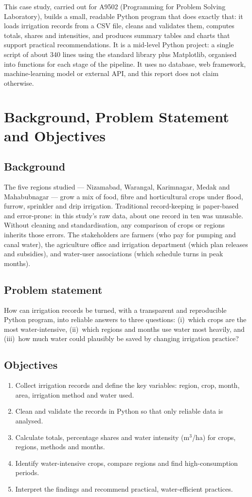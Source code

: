 \documentclass[11pt,a4paper]{article}
\begin{document}
This case study, carried out for A9502 (Programming for Problem Solving Laboratory),
builds a small, readable Python program that does exactly that: it loads irrigation
records from a CSV file, cleans and validates them, computes totals, shares and
intensities, and produces summary tables and charts that support practical
recommendations. It is a mid-level Python project: a single script of about 340 lines
using the standard library plus Matplotlib, organised into functions for each stage of
the pipeline. It uses no database, web framework, machine-learning model or external
API, and this report does not claim otherwise.

\section{Background, Problem Statement and Objectives}
\subsection{Background}
The five regions studied --- Nizamabad, Warangal, Karimnagar, Medak and
Mahabubnagar --- grow a mix of food, fibre and horticultural crops under flood,
furrow, sprinkler and drip irrigation. Traditional record-keeping is paper-based and
error-prone: in this study's raw data, about one record in ten was unusable. Without
cleaning and standardisation, any comparison of crops or regions inherits those errors.
The stakeholders are farmers (who pay for pumping and canal water), the agriculture
office and irrigation department (which plan releases and subsidies), and water-user
associations (which schedule turns in peak months).

\subsection{Problem statement}
How can irrigation records be turned, with a transparent and reproducible Python
program, into reliable answers to three questions: (i)~which crops are the most
water-intensive, (ii)~which regions and months use water most heavily, and
(iii)~how much water could plausibly be saved by changing irrigation practice?

\subsection{Objectives}
\begin{enumerate}
  \item Collect irrigation records and define the key variables: region, crop, month,
        area, irrigation method and water used.
  \item Clean and validate the records in Python so that only reliable data is analysed.
  \item Calculate totals, percentage shares and water intensity (m$^3$/ha) for crops,
        regions, methods and months.
  \item Identify water-intensive crops, compare regions and find high-consumption periods.
  \item Interpret the findings and recommend practical, water-efficient practices.
\end{enumerate}
\end{document}
